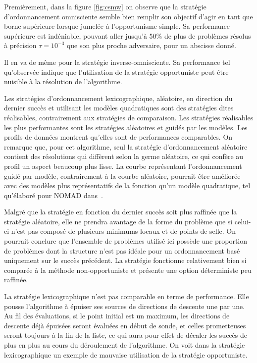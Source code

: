 Premièrement, dans la figure \ref{fig:csmw} on observe que la stratégie d'ordonnancement omnisciente semble bien remplir son objectif d'agir en tant que borne supérieure lorsque jumelée à l'opportunisme simple. Sa performance supérieure est indéniable, pouvant aller jusqu'à 50\% de plus de problèmes résolus à précision $\tau = 10^{-3}$ que son plus proche adversaire, pour un abscisse donné.

Il en va de même pour la stratégie inverse-omnisciente. Sa performance tel qu'observée indique  que l'utilisation de la stratégie opportuniste peut être nuisible à la résolution de l'algorithme.
  
Les stratégies d'ordonnancement lexicographique, aléatoire, en direction du dernier succès et utilisant les modèles quadratiques sont des stratégies dites réalisables, contrairement aux stratégies de comparaison. Les stratégies réalisables les plus performantes sont les stratégies aléatoires et guidés par les modèles. Les profils de données montrent qu'elles sont de performances comparables. On remarque que, pour cet algorithme, seul la stratégie d'ordonnancement aléatoire contient des résolutions qui diffèrent selon la germe aléatoire, ce qui confère au profil un aspect beaucoup plus lisse. La courbe représentant l'ordonnancement guidé par modèle, contrairement à la courbe aléatoire, pourrait être améliorée avec des modèles plus représentatifs de la fonction qu'un modèle quadratique, tel qu'élaboré pour NOMAD dans~\cite{TaAuLedKo2018}.
  
Malgré que la stratégie en fonction du dernier succès soit plus raffinée que la stratégie aléatoire, elle ne prendra avantage de la forme du problème que si celui-ci n'est pas composé de plusieurs minimums locaux et de points de selle. On pourrait conclure que l'ensemble de problèmes utilisé ici possède une proportion de problèmes dont la structure n'est pas idéale pour un ordonnancement basé uniquement sur le succès précédent. La stratégie fonctionne relativement bien si comparée à la méthode non-opportuniste et présente une option déterministe peu raffinée.
 
La stratégie lexicographique n'est pas comparable en terme de performance. Elle pousse l'algorithme à épuiser ses sources de directions de descente une par une. Au fil des évaluations, si le point initial est un maximum, les directions de descente déjà épuisées seront évaluées en début de sonde, et celles prometteuses seront toujours à la fin de la liste, ce qui aura pour effet de décaler les succès de plus en plus au cours du déroulement de l'algorithme. On voit dans la stratégie lexicographique un exemple de mauvaise utilisation de la stratégie opportuniste.   

